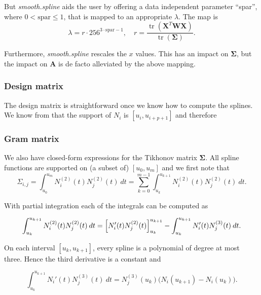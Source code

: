 \documentclass[a4paper]{scrartcl}
\newcommand{\mat}[1]{\ensuremath{\bm{#1}}}
\newcommand{\T}[1]{\ensuremath{{#1}^{T}}}
\newcommand\dd{\ensuremath{\:d}}
\DeclareMathOperator\tr{tr}
\begin{document}
But \textit{smooth.spline} aids the user by offering a data independent parameter \enquote{spar}, where $0 < \text{spar} \leq 1$, that is mapped to an appropriate $\lambda$.
The map is
\begin{equation*}
    \lambda = r\cdot 256^{3\cdot\text{spar} - 1},
    \quad
    r = \frac{\tr(\T{\mat X} \mat W \mat X)}{\tr(\mat\Sigma)}.
\end{equation*}

Furthermore, \textit{smooth.spline} rescales the $x$ values.
This has an impact on $\mat\Sigma$, but the impact on $\mat A$ is de facto alleviated by the above mapping.


\subsubsection{Design matrix}

The design matrix is straightforward once we know how to compute the splines.
We know from \cite[P2.1]{Piegl:Tiller:1997} that the support of $N_i$ is $[u_i, u_{i+p+1}]$ and therefore 


\subsubsection{Gram matrix}

We also have closed-form expressions for the Tikhonov matrix $\mat\Sigma$.
All spline functions are supported on (a subset of) $[u_0, u_m]$ and we first note that
\begin{equation}
    \label{eq:sigma_entry}
    \Sigma_{i,j}
    = \int_{u_0}^{u_m} N_i^{(2)}(t) N_j^{(2)}(t) \dd t
    = \sum_{k = 0}^{m - 1} \int_{u_k}^{u_{k+1}} N_i^{(2)}(t) N_j^{(2)}(t) \dd t.
\end{equation}

With partial integration each of the integrals can be computed as

\begin{equation*}
    \int_{u_k}^{u_{k+1}} N_i^{(2)}(t) N_j^{(2)}(t) \dd t
    = \Bigl[ N_i'(t) N_j^{(2)}(t) \Bigr]_{u_k}^{u_{k+1}} -
    \int_{u_k}^{u_{k+1}} N_i'(t) N_j^{(3)}(t) \dd t.
\end{equation*}

On each interval $[u_k, u_{k+1}]$, every spline is a polynomial of degree at most three.
Hence the third derivative is a constant and

\begin{equation*}
    \int_{u_k}^{u_{k+1}} N_i'(t) N_j^{(3)}(t) \dd t
    = N_j^{(3)}(u_k) \bigl(N_i(u_{k+1}) - N_i(u_k)\bigr).
\end{equation*}
\end{document}
